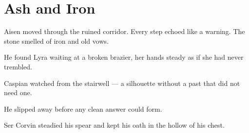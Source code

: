 \documentclass{cwbook}
\begin{document}
\chapter{Ash and Iron}

\PrintRoster

\TopLandscape

Aisen moved through the ruined corridor. Every step echoed like a warning. The stone smelled of iron and old vows.

He found Lyra waiting at a broken brazier, her hands steady as if she had never trembled.

\shift

\TopLandscape

Caspian watched from the stairwell — a silhouette without a past that did not need one.

He slipped away before any clean answer could form.

\shift

\TopLandscape

Ser Corvin steadied his spear and kept his oath in the hollow of his chest.

\BottomLandscape
\end{document}
